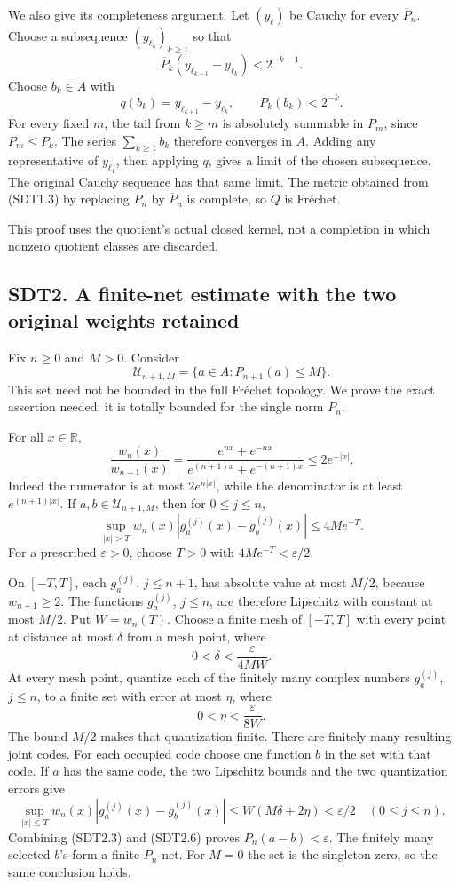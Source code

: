 We also give its completeness argument. Let \((y_\ell)\) be Cauchy for
every \(\overline P_n\). Choose a subsequence \((y_{\ell_k})_{k\ge1}\)
so that \[
\overline P_k(y_{\ell_{k+1}}-y_{\ell_k})<2^{-k-1}.
\] Choose \(b_k\in A\) with \[
q(b_k)=y_{\ell_{k+1}}-y_{\ell_k},\qquad P_k(b_k)<2^{-k}.
\tag{SDT1.6}
\] For every fixed \(m\), the tail from \(k\ge m\) is absolutely
summable in \(P_m\), since \(P_m\le P_k\). The series
\(\sum_{k\ge1}b_k\) therefore converges in \(A\). Adding any
representative of \(y_{\ell_1}\), then applying \(q\), gives a limit of
the chosen subsequence. The original Cauchy sequence has that same
limit. The metric obtained from (SDT1.3) by replacing \(P_n\) by
\(\overline P_n\) is complete, so \(Q\) is Fréchet.

This proof uses the quotient's actual closed kernel, not a completion in
which nonzero quotient classes are discarded.

\subsection{SDT2. A finite-net estimate with the two original weights
retained}\label{sdt2.-a-finite-net-estimate-with-the-two-original-weights-retained}

Fix \(n\ge0\) and \(M>0\). Consider \[
\mathcal U_{n+1,M}=\{a\in A:P_{n+1}(a)\le M\}.
\tag{SDT2.1}
\] This set need not be bounded in the full Fréchet topology. We prove
the exact assertion needed: it is totally bounded for the single norm
\(P_n\).

For all \(x\in\mathbb R\), \[
\frac{w_n(x)}{w_{n+1}(x)}
=\frac{e^{nx}+e^{-nx}}{e^{(n+1)x}+e^{-(n+1)x}}
\le 2e^{-|x|}.
\tag{SDT2.2}
\] Indeed the numerator is at most \(2e^{n|x|}\), while the denominator
is at least \(e^{(n+1)|x|}\). If \(a,b\in\mathcal U_{n+1,M}\), then for
\(0\le j\le n\), \[
\sup_{|x|>T}w_n(x)|g_a^{(j)}(x)-g_b^{(j)}(x)|
\le 4M e^{-T}.
\tag{SDT2.3}
\] For a prescribed \(\varepsilon>0\), choose \(T>0\) with
\(4Me^{-T}<\varepsilon/2\).

On \([-T,T]\), each \(g_a^{(j)}\), \(j\le n+1\), has absolute value at
most \(M/2\), because \(w_{n+1}\ge2\). The functions \(g_a^{(j)}\),
\(j\le n\), are therefore Lipschitz with constant at most \(M/2\). Put
\(W=w_n(T)\). Choose a finite mesh of \([-T,T]\) with every point at
distance at most \(\delta\) from a mesh point, where \[
0<\delta<\frac{\varepsilon}{4MW}.
\tag{SDT2.4}
\] At every mesh point, quantize each of the finitely many complex
numbers \(g_a^{(j)}\), \(j\le n\), to a finite set with error at most
\(\eta\), where \[
0<\eta<\frac{\varepsilon}{8W}.
\tag{SDT2.5}
\] The bound \(M/2\) makes that quantization finite. There are finitely
many resulting joint codes. For each occupied code choose one function
\(b\) in the set with that code. If \(a\) has the same code, the two
Lipschitz bounds and the two quantization errors give \[
\sup_{|x|\le T}w_n(x)|g_a^{(j)}(x)-g_b^{(j)}(x)|
\le W(M\delta+2\eta)<\varepsilon/2
\quad(0\le j\le n).
\tag{SDT2.6}
\] Combining (SDT2.3) and (SDT2.6) proves \(P_n(a-b)<\varepsilon\). The
finitely many selected \(b\)'s form a finite \(P_n\)-net. For \(M=0\)
the set is the singleton zero, so the same conclusion holds.

